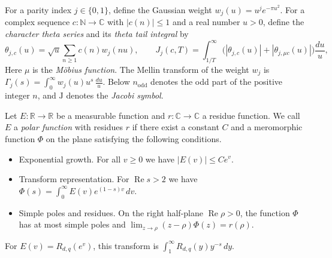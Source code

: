 \begin{definition}
\label{def:char-theta-series}
\emitthmsource
For a parity index $j\in\{0,1\}$, define the Gaussian weight $w_j(u)=u^j e^{-\pi u^2}$. For a complex sequence $c\colon\mathbb N\to\mathbb C$ with $|c(n)|\le1$ and a real number $u>0$, define the \emph{character theta series} and its \emph{theta tail integral} by
\[
 \theta_{j,c}(u)=\sqrt{u}\sum_{n\ge1}c(n)w_j(nu),\qquad
 J_j(c,T)=\int_{1/T}^\infty
 \bigl(|\theta_{j,c}(u)|+|\theta_{j,\mu c}(u)|\bigr)\frac{du}{u},
\]
Here $\mu$ is the \emph{Möbius function}. The Mellin transform of the weight $w_j$ is $\Gamma_j(s)=\int_0^\infty w_j(u)u^s\,\frac{du}{u}$. Below $n_{\mathrm{odd}}$ denotes the odd part of the positive integer $n$, and $\mathrm J$ denotes the \emph{Jacobi symbol}.
\end{definition}

\begin{definition}
\label{def:polar-function}
\emitthmsource
Let $E\colon\mathbb R\to\mathbb R$ be a measurable function and $r\colon\mathbb C\to\mathbb C$ a residue function. We call $E$ a \emph{polar function} with residues $r$ if there exist a constant $C$ and a meromorphic function $\Phi$ on the plane satisfying the following conditions.
\begin{itemize}
\item Exponential growth. For all $v\ge0$ we have $|E(v)|\le Ce^v$.
\item Transform representation. For $\operatorname{Re}s>2$ we have $\Phi(s)=\int_0^\infty E(v)e^{(1-s)v}\,dv$.
\item Simple poles and residues. On the right half-plane $\operatorname{Re}\rho>0$, the function $\Phi$ has at most simple poles and $\lim_{z\to\rho}(z-\rho)\Phi(z)=r(\rho)$.
\end{itemize}
For $E(v)=R_{d,q}(e^v)$, this transform is $\int_1^\infty R_{d,q}(y)y^{-s}\,dy$.
\end{definition}

